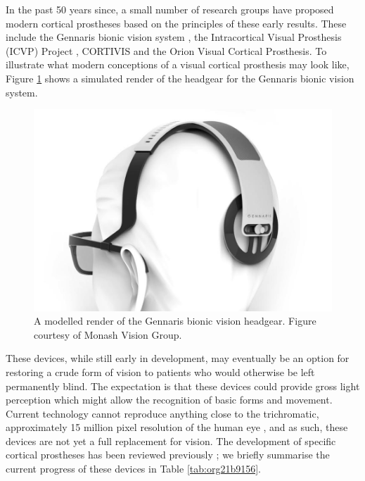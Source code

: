\documentclass[a4paper,11pt,openany]{book}
\begin{document}
In the past 50 years since, a small number of research groups have proposed modern cortical prostheses based on the principles of these early results.
These include the Gennaris bionic vision system \cite{lowery_restoration_2015,lowery_monash_2017}, the Intracortical Visual Prosthesis (ICVP) Project \cite{troyk_intracortical_2017}, CORTIVIS \cite{fernandez_cortivis_2017} and the Orion Visual Cortical Prosthesis. \cite{secondsight_second_nodate}
To illustrate what modern conceptions of a visual cortical prosthesis may look like, Figure \ref{fig:org091105c} shows a simulated render of the headgear for the Gennaris bionic vision system.

\begin{figure}[htbp]
\centering
\includegraphics[width=.9\linewidth]{./graphics/litreview/headgear2.jpg}
\caption[Modelled render of the Gennaris bionic vision headgear]{\label{fig:org091105c}
A modelled render of the Gennaris bionic vision headgear. Figure courtesy of Monash Vision Group.}
\end{figure}

These devices, while still early in development, may eventually be an option for restoring a crude form of vision to patients who would otherwise be left permanently blind.
The expectation is that these devices could provide gross light perception which might allow the recognition of basic forms and movement. \cite{lowery_monash_2017,lowery_restoration_2015}
Current technology cannot reproduce anything close to the trichromatic, approximately 15 million pixel resolution of the human eye \cite{deering_limits_1998}, and as such, these devices are not yet a full replacement for vision.
The development of specific cortical prostheses has been reviewed previously \cite{niketeghad_brain_2019}; we briefly summarise the current progress of these devices in Table \ref{tab:org21b9156}.
\end{document}
